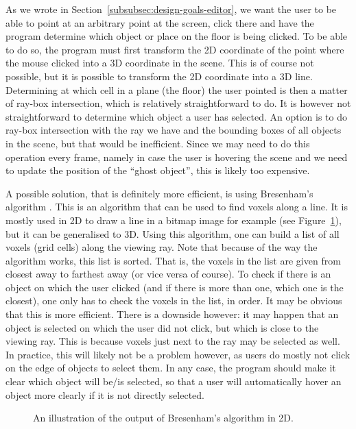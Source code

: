 As we wrote in Section~\ref{subsubsec:design-goals-editor}, we want the user to be able to point at an arbitrary point at the screen, click there and have the program determine which object or place on the floor is being clicked. To be able to do so, the program must first transform the 2D coordinate of the point where the mouse clicked into a 3D coordinate in the scene. This is of course not possible, but it is possible to transform the 2D coordinate into a 3D line. Determining at which cell in a plane (the floor) the user pointed is then a matter of ray-box intersection, which is relatively straightforward to do. It is however not straightforward to determine which object a user has selected. An option is to do ray-box intersection with the ray we have and the bounding boxes of all objects in the scene, but that would be inefficient. Since we may need to do this operation every frame, namely in case the user is hovering the scene and we need to update the position of the ``ghost object'', this is likely too expensive.

A possible solution, that is definitely more efficient, is using Bresenham's algorithm \cite{cohen1994voxel,bresenhamwiki}. This is an algorithm that can be used to find voxels along a line. It is mostly used in 2D to draw a line in a bitmap image for example (see Figure~\ref{fig:bresenham-sketch}), but it can be generalised to 3D. Using this algorithm, one can build a list of all voxels (grid cells) along the viewing ray. Note that because of the way the algorithm works, this list is sorted. That is, the voxels in the list are given from closest away to farthest away (or vice versa of course). To check if there is an object on which the user clicked (and if there is more than one, which one is the closest), one only has to check the voxels in the list, in order. It may be obvious that this is more efficient. There is a downside however: it may happen that an object is selected on which the user did not click, but which is close to the viewing ray. This is because voxels just next to the ray may be selected as well. In practice, this will likely  not be a problem however, as users do mostly not click on the edge of objects to select them. In any case, the program should make it clear which object will be/is selected, so that a user will automatically hover an object more clearly if it is not directly selected.

\begin{figure}[h]
  \centering
  \quad
  \quad
  \caption{An illustration of the output of Bresenham's algorithm in 2D.}
  \label{fig:bresenham-sketch}
\end{figure}
